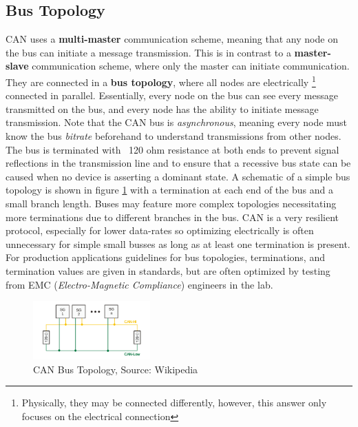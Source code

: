 \documentclass[main.tex]{subfiles}
\begin{document}
\subsection{Bus Topology}
CAN uses a \textbf{multi-master} communication scheme, meaning that any node on the bus can initiate a message transmission. This is in contrast to a \textbf{master-slave} communication scheme, where only the master can initiate communication. They are connected in a \textbf{bus topology}, where all nodes are electrically \footnote{Physically, they may be connected differently, however, this answer only focuses on the electrical connection} connected in parallel. Essentially, every node on the bus can see every message transmitted on the bus, and every node has the ability to initiate message transmission. Note that the CAN bus is \textit{asynchronous}, meaning every node must know the bus \textit{bitrate} beforehand to understand transmissions from other nodes.
\newline
\newnoindentpara
The bus is terminated with ~120 ohm resistance at both ends to prevent signal reflections in the transmission line and to ensure that a recessive bus state can be caused when no device is asserting a dominant state. A schematic of a simple bus topology is shown in figure \ref{fig:bus-topology} with a termination at each end of the bus and a small branch length. Buses may feature more complex topologies necessitating more terminations due to different branches in the bus. CAN is a very resilient protocol, especially for lower data-rates so optimizing electrically is often unnecessary for simple small busses as long as at least one termination is present. For production applications guidelines for bus topologies, terminations, and termination values are given in standards, but are often optimized by testing from EMC (\textit{Electro-Magnetic Compliance}) engineers in the lab.

\begin{figure}[H]
    \centering
    \includegraphics[width=0.4\textwidth]{images/wikipedia_can_bus_topology.png}
    \caption{CAN Bus Topology, Source: Wikipedia \cite{wikipedia_can_bus_image}}
    \label{fig:bus-topology}
\end{figure}
\end{document}
